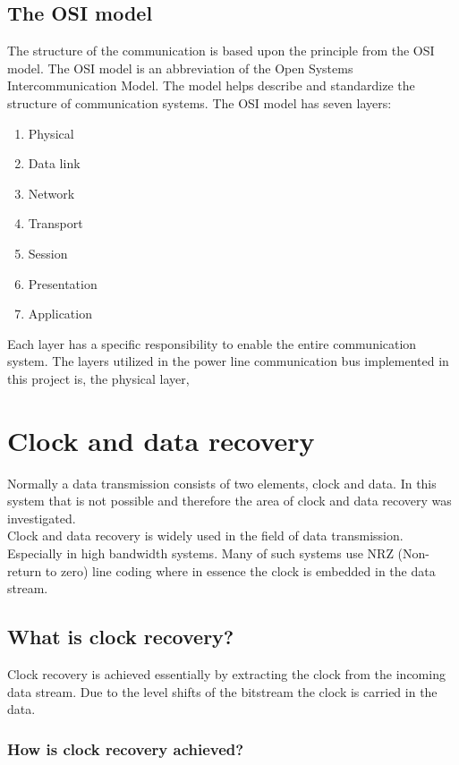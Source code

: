 \subsection{The OSI model}
The structure of the communication is based upon the principle from the OSI model. The OSI model is an abbreviation of the Open Systems Intercommunication Model. The model helps describe and standardize the structure of communication systems. The OSI model has seven layers:
\begin{enumerate}
	\item Physical
	\item Data link
	\item Network
	\item Transport
	\item Session
	\item Presentation
	\item Application
\end{enumerate}

Each layer has a specific responsibility to enable the entire communication system. The layers utilized in the power line communication bus implemented in this project is, the physical layer, 


\section{Clock and data recovery}
Normally a data transmission consists of two elements, clock and data. In this system that is not possible and therefore the area of clock and data recovery was investigated.\\
Clock and data recovery is widely used in the field of data transmission. Especially in high bandwidth systems. Many of such systems use NRZ (Non-return to zero) line coding where in essence the clock is embedded in the data stream.

\subsection{What is clock recovery?}
Clock recovery is achieved essentially by extracting the clock from the incoming data stream. Due to the level shifts of the bitstream the clock is carried in the data.

\subsubsection{How is clock recovery achieved?}


